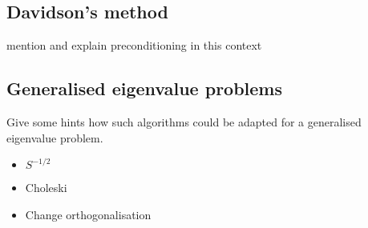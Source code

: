 \subsection{Davidson's method}
\label{sec:Davidson}

mention and explain preconditioning in this context

\subsection{Generalised eigenvalue problems}
\label{sec:GeneralisedEigenvalueProblem}
Give some hints how such algorithms
could be adapted for a generalised eigenvalue problem.


\begin{itemize}
	\item $S^{-1/2}$
	\item Choleski
	\item Change orthogonalisation
\end{itemize}


